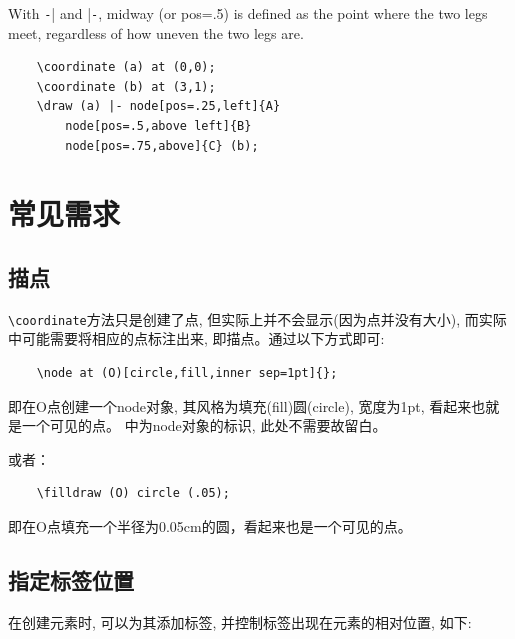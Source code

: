 With \verb|-|| and |\verb|-|, midway (or pos=.5) is defined as the point where the two legs meet, regardless of how uneven the two legs are.

\begin{lstlisting}
    \coordinate (a) at (0,0);
    \coordinate (b) at (3,1);
    \draw (a) |- node[pos=.25,left]{A}
        node[pos=.5,above left]{B}
        node[pos=.75,above]{C} (b);
\end{lstlisting}

\begin{center}
\end{center}
\section{常见需求}

\subsection{描点}

\verb|\coordinate|方法只是创建了点, 但实际上并不会显示(因为点并没有大小), 而实际中可能需要将相应的点标注出来, 即描点。通过以下方式即可:

\begin{lstlisting}
    \node at (O)[circle,fill,inner sep=1pt]{};
\end{lstlisting}

即在O点创建一个node对象, 其风格为填充(fill)圆(circle), 宽度为1pt, 看起来也就是一个可见的点。 {}中为node对象的标识, 此处不需要故留白。

或者：

\begin{lstlisting}
    \filldraw (O) circle (.05);
\end{lstlisting}

即在O点填充一个半径为0.05cm的圆，看起来也是一个可见的点。

\subsection{指定标签位置}

在创建元素时, 可以为其添加标签, 并控制标签出现在元素的相对位置, 如下:

